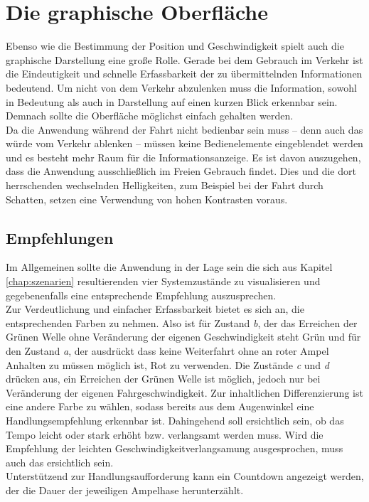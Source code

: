 \section{Die graphische Oberfläche}
Ebenso wie die Bestimmung der Position und Geschwindigkeit spielt auch die graphische Darstellung eine große Rolle. Gerade bei dem Gebrauch im Verkehr ist die Eindeutigkeit und schnelle Erfassbarkeit der zu übermittelnden Informationen bedeutend. Um nicht von dem Verkehr abzulenken muss die Information, sowohl in Bedeutung als auch in Darstellung auf einen kurzen Blick erkennbar sein. Demnach sollte die Oberfläche möglichst einfach gehalten werden.\\
Da die Anwendung während der Fahrt nicht bedienbar sein muss -- denn auch das würde vom Verkehr ablenken -- müssen keine Bedienelemente eingeblendet werden und es besteht mehr Raum für die Informationsanzeige. 
Es ist davon auszugehen, dass die Anwendung ausschließlich im Freien Gebrauch findet. Dies und die dort herrschenden wechselnden Helligkeiten, zum Beispiel bei der Fahrt durch Schatten, setzen eine Verwendung von hohen Kontrasten voraus.
\subsection{Empfehlungen}
Im Allgemeinen sollte die Anwendung in der Lage sein die sich aus Kapitel \ref{chap:szenarien} resultierenden vier Systemzustände zu visualisieren und gegebenenfalls eine entsprechende Empfehlung auszusprechen.\\
Zur Verdeutlichung und einfacher Erfassbarkeit bietet es sich an, die entsprechenden Farben zu nehmen. Also ist für Zustand \textit{b}, der das Erreichen der Grünen Welle ohne Veränderung der eigenen Geschwindigkeit steht Grün und für den Zustand \textit{a}, der ausdrückt dass keine Weiterfahrt ohne an roter Ampel Anhalten zu müssen möglich ist, Rot zu verwenden.
Die Zustände \textit{c} und \textit{d} drücken aus, ein Erreichen der Grünen Welle ist möglich, jedoch nur bei Veränderung der eigenen Fahrgeschwindigkeit. Zur inhaltlichen Differenzierung ist eine andere Farbe zu wählen, sodass bereits aus dem Augenwinkel eine Handlungsempfehlung erkennbar ist. Dahingehend soll ersichtlich sein, ob das Tempo leicht oder stark erhöht bzw. verlangsamt werden muss. Wird die Empfehlung der leichten Geschwindigkeitverlangsamung ausgesprochen, muss auch das ersichtlich sein.\\
Unterstützend zur Handlungsaufforderung kann ein Countdown angezeigt werden, der die Dauer der jeweiligen Ampelhase herunterzählt. 
